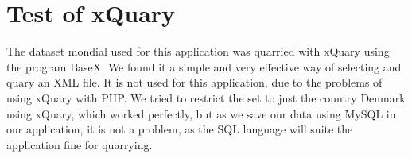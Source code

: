 \section{Test of xQuary}
The dataset mondial used for this application was quarried with xQuary using the program BaseX. We found it a simple and very effective way of selecting and quary an XML file. It is not used for this application, due to the problems of using xQuary with PHP. We tried to restrict the set to just the country Denmark using xQuary, which worked perfectly, but as we save our data using MySQL in our application, it is not a problem, as the SQL language will suite the application fine for quarrying.